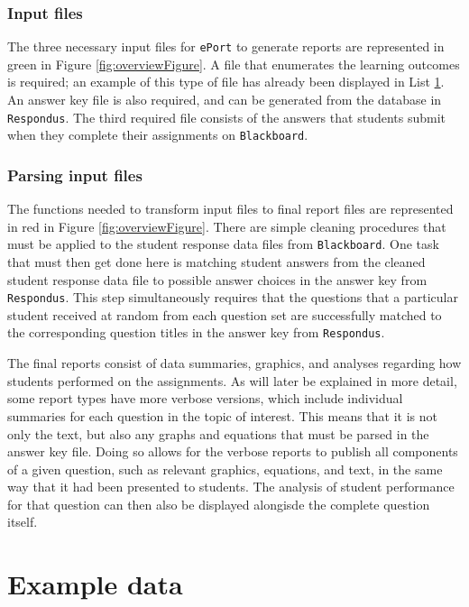 \documentclass[11pt,a4paper,oldfontcommands,openany]{memoir}
\numberwithin{equation}{section} %
\begin{document}
\subsection{Input files}

The three necessary input files for \texttt{ePort} to generate reports are represented in green in Figure \ref{fig:overviewFigure}. A file that enumerates the learning outcomes is required; an example of this type of file has already been displayed in List \hyperref[sec:lo]{1}. An answer key file is also required, and can be generated from the database in \texttt{Respondus}. The third required file consists of the answers that students submit when they complete their assignments on \texttt{Blackboard}.

\subsection{Parsing input files}

The functions needed to transform input files to final report files are represented in red in Figure \ref{fig:overviewFigure}. There are simple cleaning procedures that must be applied to the student response data files from \texttt{Blackboard}. One task that must then get done here is matching student answers from the cleaned student response data file to possible answer choices in the answer key from \texttt{Respondus}. This step simultaneously requires that the questions that a particular student received at random from each question set are successfully matched to the corresponding question titles in the answer key from \texttt{Respondus}.

The final reports consist of data summaries, graphics, and analyses regarding how students performed on the assignments. As will later be explained in more detail, some report types have more verbose versions, which include individual summaries for each question in the topic of interest. This means that it is not only the text, but also any graphs and equations that must be parsed in the answer key file. Doing so allows for the verbose reports to publish all components of a given question, such as relevant graphics, equations, and text, in the same way that it had been presented to students. The analysis of student performance for that question can then also be displayed alongisde the complete question itself.

\chapter{Example data}
\end{document}
